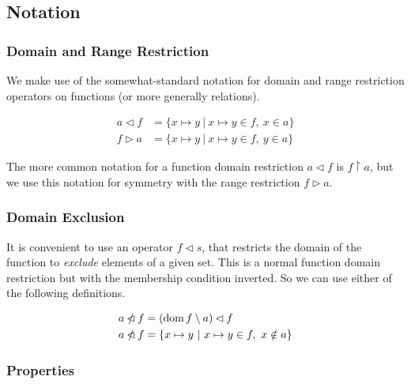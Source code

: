 \documentclass{article}
\DeclareMathOperator{\dom}{dom}
\newcommand{\restrictdom}{\lhd}
\newcommand{\subtractdom}{\mathbin{\slashed{\restrictdom}}}
\newcommand{\restrictrange}{\rhd}
\begin{document}
\subsection{Notation}

\subsubsection{Domain and Range Restriction}

We make use of the somewhat-standard notation for domain and range restriction
operators on functions (or more generally relations).

\begin{equation*}
\begin{split}
a \restrictdom  f  & = \{ x \mapsto y ~|~ x \mapsto y \in f, ~ x \in a \} \\
f \restrictrange a  & = \{ x \mapsto y ~|~ x \mapsto y \in f, ~ y \in a \}
\end{split}
\end{equation*}

The more common notation for a function domain restriction $a \restrictdom f$
is $f \restriction a$, but we use this notation for symmetry with the range
restriction $f \restrictrange a$.

\subsubsection{Domain Exclusion}

It is convenient to use an operator $f \restrictdom s$, that restricts the
domain of the function to \emph{exclude} elements of a given set. This is a
normal function domain restriction but with the membership condition inverted.
So we can use either of the following definitions.

\begin{equation*}
\begin{split}
a \subtractdom f  & = ( \dom f \setminus a ) \restrictdom f \\
a \subtractdom f  & = \{ x \mapsto y ~|~ x \mapsto y \in f, ~ x \notin a \}
\end{split}
\end{equation*}

\subsubsection{Properties}
\end{document}
